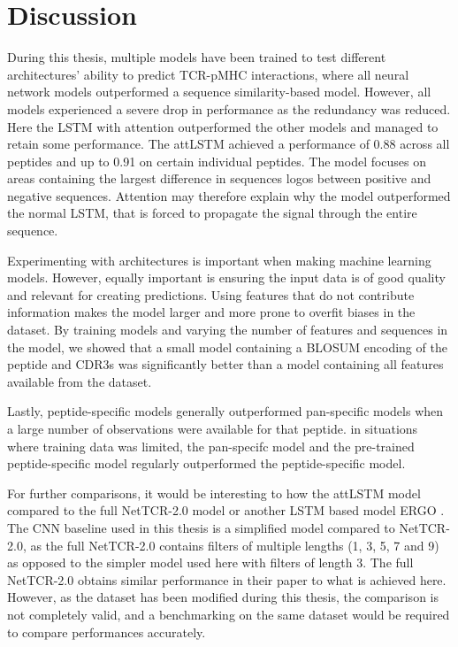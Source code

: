 \section{Discussion} \label{discussion}
During this thesis, multiple models have been trained to test different architectures' ability to predict TCR-pMHC interactions, where all neural network models outperformed a sequence similarity-based model. However, all models experienced a severe drop in performance as the redundancy was reduced. Here the LSTM with attention outperformed the other models and managed to retain some performance. The attLSTM achieved a performance of 0.88 across all peptides and up to 0.91 on certain individual peptides. The model focuses on areas containing the largest difference in sequences logos between positive and negative sequences. Attention may therefore explain why the model outperformed the normal LSTM, that is forced to propagate the signal through the entire sequence.

Experimenting with architectures is important when making machine learning models. However, equally important is ensuring the input data is of good quality and relevant for creating predictions. Using features that do not contribute information makes the model larger and more prone to overfit biases in the dataset. By training models and varying the number of features and sequences in the model, we showed that a small model containing a BLOSUM encoding of the peptide and CDR3s was significantly better than a model containing all features available from the dataset.

Lastly, peptide-specific models generally outperformed pan-specific models when a large number of observations were available for that peptide. in situations where training data was limited, the pan-specifc model and the pre-trained peptide-specific model regularly outperformed the peptide-specific model.

For further comparisons, it would be interesting to how the attLSTM model compared to the full NetTCR-2.0 model \cite{Montemurro2021NetTCR-2.0Data} or another LSTM based model ERGO \cite{Springer2020PredictionPairs}. The CNN baseline used in this thesis is a simplified model compared to NetTCR-2.0, as the full NetTCR-2.0 contains filters of multiple lengths (1, 3, 5, 7 and 9) as opposed to the simpler model used here with filters of length 3. The full NetTCR-2.0 obtains similar performance in their paper to what is achieved here. However, as the dataset has been modified during this thesis, the comparison is not completely valid, and a benchmarking on the same dataset would be required to compare performances accurately.

